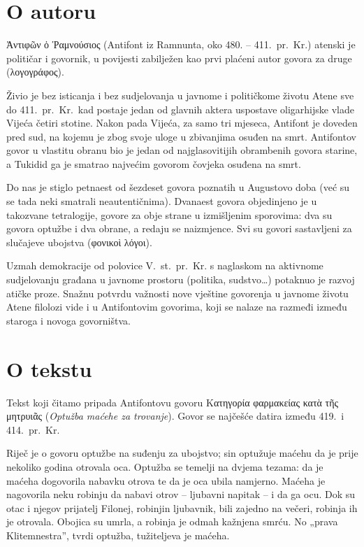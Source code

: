 \section*{O autoru}

\textgreek[variant=ancient]{Ἀντιφῶν ὁ Ῥαμνούσιος} (Antifont iz Ramnunta, oko 480. – 411.\ pr.~Kr.) atenski je političar i govornik, u povijesti zabilježen kao prvi plaćeni autor govora za druge \textgreek[variant=ancient]{(λογογράφος).}
 
Živio je bez isticanja i bez sudjelovanja u javnome i političkome životu Atene sve do 411.\ pr.~Kr.\ kad postaje jedan od glavnih aktera uspostave oligarhijske vlade Vijeća četiri stotine. Nakon pada Vijeća, za samo tri mjeseca, Antifont je doveden pred sud, na kojemu je zbog svoje uloge u zbivanjima osuđen na smrt. Antifontov govor u vlastitu obranu bio je jedan od najglasovitijih obrambenih govora starine, a Tukidid ga je smatrao najvećim govorom čovjeka osuđena na smrt.

Do nas je stiglo petnaest od šezdeset govora poznatih u Augustovo doba (već su se tada neki smatrali neautentičnima). Dvanaest govora objedinjeno je u takozvane tetralogije, govore za obje strane u izmišljenim sporovima: dva su govora optužbe i dva obrane, a redaju se naizmjence. Svi su govori sastavljeni za slučajeve ubojstva \textgreek[variant=ancient]{(φονικοὶ λόγοι).}

Uzmah demokracije od polovice V.~st.\ pr.~Kr. s naglaskom na aktivnome sudjelovanju građana u javnome prostoru (politika, sudstvo\dots) potaknuo je razvoj atičke proze. Snažnu potvrdu važnosti nove vještine govorenja u javnome životu Atene filolozi vide i u Antifontovim govorima, koji se nalaze na razmeđi između staroga i novoga govorništva.

\section*{O tekstu}

Tekst koji čitamo pripada Antifontovu govoru \textgreek[variant=ancient]{Κατηγορία φαρμακείας κατὰ τῆς μητρυιᾶς} (\textit{Optužba maćehe za trovanje}). Govor se najčešće datira između 419.\ i 414.\ pr.~Kr.

Riječ je o govoru optužbe na suđenju za ubojstvo; sin optužuje maćehu da je prije nekoliko godina otrovala oca. Optužba se temelji na dvjema tezama: da je maćeha dogovorila nabavku otrova te da je oca ubila namjerno. Maćeha je nagovorila neku robinju da nabavi otrov – ljubavni napitak – i da ga ocu. Dok su otac i njegov  prijatelj Filonej, robinjin ljubavnik, bili zajedno na večeri, robinja ih je otrovala. Obojica su umrla, a robinja je odmah kažnjena smrću. No „prava Klitemnestra”, tvrdi optužba, tužiteljeva je maćeha.

